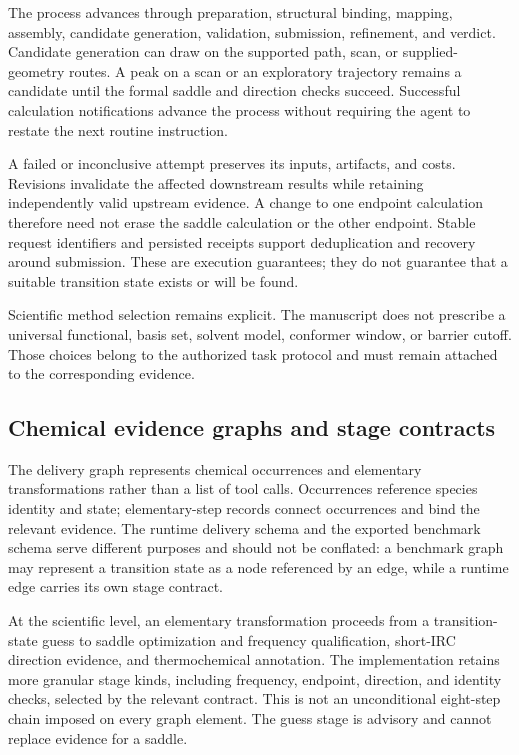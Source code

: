 \documentclass[11pt,a4paper]{article}
\begin{document}
The process advances through preparation, structural binding, mapping, assembly, candidate generation, validation, submission, refinement, and verdict. Candidate generation can draw on the supported path, scan, or supplied-geometry routes. A peak on a scan or an exploratory trajectory remains a candidate until the formal saddle and direction checks succeed. Successful calculation notifications advance the process without requiring the agent to restate the next routine instruction.

A failed or inconclusive attempt preserves its inputs, artifacts, and costs. Revisions invalidate the affected downstream results while retaining independently valid upstream evidence. A change to one endpoint calculation therefore need not erase the saddle calculation or the other endpoint. Stable request identifiers and persisted receipts support deduplication and recovery around submission. These are execution guarantees; they do not guarantee that a suitable transition state exists or will be found.

Scientific method selection remains explicit. The manuscript does not prescribe a universal functional, basis set, solvent model, conformer window, or barrier cutoff. Those choices belong to the authorized task protocol and must remain attached to the corresponding evidence.

\subsection{Chemical evidence graphs and stage contracts}
The delivery graph represents chemical occurrences and elementary transformations rather than a list of tool calls. Occurrences reference species identity and state; elementary-step records connect occurrences and bind the relevant evidence. The runtime delivery schema and the exported benchmark schema serve different purposes and should not be conflated: a benchmark graph may represent a transition state as a node referenced by an edge, while a runtime edge carries its own stage contract.

At the scientific level, an elementary transformation proceeds from a transition-state guess to saddle optimization and frequency qualification, short-IRC direction evidence, and thermochemical annotation. The implementation retains more granular stage kinds, including frequency, endpoint, direction, and identity checks, selected by the relevant contract. This is not an unconditional eight-step chain imposed on every graph element. The guess stage is advisory and cannot replace evidence for a saddle.
\end{document}
